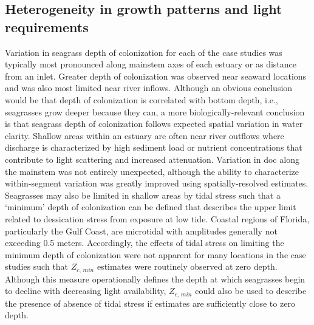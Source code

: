 \documentclass[letterpaper,12pt,oneside]{article}\usepackage[]{graphicx}\usepackage[]{color}
\begin{document}

\subsection{Heterogeneity in growth patterns and light requirements}

Variation in seagrass depth of colonization for each of the case studies was typically most pronounced along mainstem axes of each estuary or as distance from an inlet.  Greater depth of colonization was observed near seaward locations and was also most limited near river inflows.  Although an obvious conclusion would be that depth of colonization is correlated with bottom depth, i.e., seagrasses grow deeper because they can, a more biologically-relevant conclusion is that seagrass depth of colonization follows expected spatial variation in water clarity.  Shallow areas within an estuary are often near river outflows where discharge is characterized by high sediment load or nutrient concentrations that contribute to light scattering and increased attenuation.  Variation in \ac{doc} along the mainstem was not entirely unexpected, although the ability to characterize within-segment variation was greatly improved using spatially-resolved estimates.  Seagrasses may also be limited in shallow areas by tidal stress such that a `minimum' depth of colonization can be defined that describes the upper limit related to dessication stress from exposure at low tide.  Coastal regions of Florida, particularly the Gulf Coast, are microtidal with amplitudes generally not exceeding 0.5 meters.  Accordingly, the effects of tidal stress on limiting the minimum depth of colonization were not apparent for many locations in the case studies such that $Z_{c,\,min}$ estimates were routinely observed at zero depth.  Although this measure operationally defines the depth at which seagrasses begin to decline with decreasing light availability, $Z_{c,\,min}$ could also be used to describe the presence of absence of tidal stress if estimates are sufficiently close to zero depth.
\end{document}
